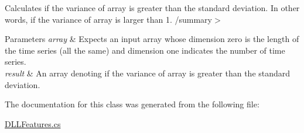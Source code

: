 Calculates if the variance of array is greater than the standard deviation. In other words, if the variance of array is larger than 1. /summary$>$ 
\begin{DoxyParams}{Parameters}
{\em array} & Expects an input array whose dimension zero is the length of the time series (all the same) and dimension one indicates the number of time series.\\
\hline
{\em result} & An array denoting if the variance of array is greater than the standard deviation.\\
\hline
\end{DoxyParams}




The documentation for this class was generated from the following file\+:\begin{DoxyCompactItemize}
\item 
\mbox{\hyperlink{_d_l_l_features_8cs}{D\+L\+L\+Features.\+cs}}\end{DoxyCompactItemize}
